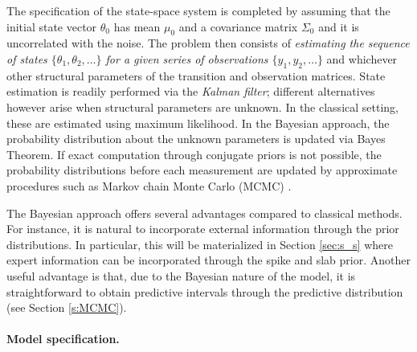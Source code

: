 


The specification of the state-space system is completed by assuming that the initial state vector $\theta_0$ has mean $\mu_0$ and a covariance matrix $\Sigma_0$ and it is uncorrelated with the noise. The problem then consists of \emph{estimating the sequence of states $\{\theta_1, \theta_2, \ldots\}$ for a given series of observations $\{y_1, y_2, \ldots\}$} and whichever other structural parameters of the transition and observation matrices. State estimation is readily performed via the \emph{Kalman filter};  different alternatives however arise  when structural parameters are unknown. In the classical setting, these are estimated using maximum likelihood. In the Bayesian approach, the probability distribution about the unknown parameters is updated via Bayes Theorem. If exact computation through conjugate priors is not possible, the probability distributions before each measurement are updated by approximate procedures such as Markov chain Monte Carlo (MCMC) \cite{scott2014predicting}. 

The Bayesian approach offers several advantages compared to classical methods. For instance, it is natural to incorporate external information through the prior distributions. In particular, this will be materialized in Section \ref{sec:s_s} where expert information can be incorporated through the spike and slab prior. Another useful advantage is that, due to the Bayesian nature of the model, it is straightforward to obtain predictive intervals through the predictive distribution (see Section \ref{s:MCMC}).


\paragraph{Model specification.}\label{sec:model}






